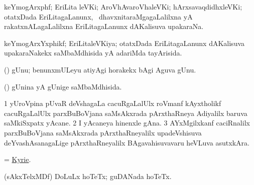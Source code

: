 \bentry
{}
\gl{\nA}
\bmng
keYmogArxphf; EriLita leVKi; AroVhAvaroVhaleVKi; hArxsavaqdidhxleVKi; otatxDada EriLitagaLanunx, \udA\ dhavxnitaraMgagaLalilxna yA rakatxnALagaLalilxna EriLitagaLanunx dAKalisuva upakaraNa. 
\emng
\eentry

\bentry
{}
\gl{\gu}
\bmng
keYmogArxYxphikf; EriLitaleVKiya; otatxDada EriLitagaLanunx dAKalisuva upakaraNakekx saMbaMdhisida yA adariMda tayArisida. 
\emng
\eentry

\bentry
{}
\gl{\gu}
\bmng
(\veYshA) gUnu; benunxmULeyu atiyAgi horakekx bAgi Aguva gUnu. 
\emng
\eentry

\bentry
{}
\gl{\gu}
\bmng
(\veYshA) gUnina yA gUnige saMbaMdhisida. 
\emng
\eentry

\bentry
{}
\gl{\nA}
\bmng
\bnum
\num{1} yUroVpina pUvaR deVshagaLa cacuRgaLalUlx roVmanf kAyxtholikf cacuRgaLalUlx parxBuBoVjana saMsAkxrada pArxthaRneya Adiyalilx baruva saMkiSxpatx yAcane. 
\num{2} I yAcaneya hinenxle gAna. 
\num{3} AYxMgilxkanf caciRnalilx parxBuBoVjana saMsAkxrada pArxthaRneyalilx upadeVshisuva deYvashAsanagaLige pArxthaRneyalilx BAgavahisuvavaru heVLuva asutxkAra. 
\enum
\emng
\eentry

\bentry
{}
\gl{\nA}
\bmng
 = \hyperlink{Kyrie}{Kyrie}. 
\emng
\eentry

\bentry
{}
\gl{\nA}
\bmng
(sAkxTelxMDf) DoLuLx hoTeTx; guDANada hoTeTx. 
\emng
\eentry

%
